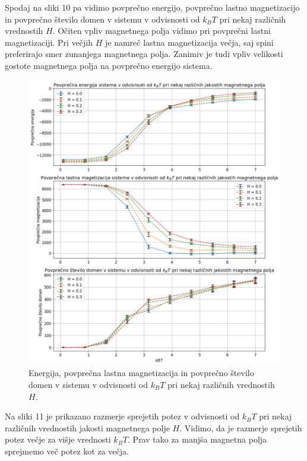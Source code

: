 \documentclass[slovene,11pt,a4paper]{article}
\begin{document}
Spodaj na sliki 10 pa vidimo povprečno energijo, povprečno lastno magnetizacijo in povprečno število domen v sistemu v odvisnosti od $k_BT$ pri nekaj različnih vrednostih $H$. Očiten vpliv magnetnega polja vidimo pri povprečni lastni magnetizaciji. Pri večjih $H$ je namreč lastna magnetizacija večja, saj spini preferirajo smer zunanjega magnetnega polja. Zanimiv je tudi vpliv velikosti gostote magnetnega polja na povprečno energijo sistema.

\begin{figure}[h!]
\centering
\includegraphics[width=\linewidth]{ising6.png}
\caption{Energija, povprečna lastna magnetizacija in povprečno število domen v sistemu v odvisnosti od $k_BT$ pri nekaj različnih vrednostih $H$.}
\end{figure}

Na sliki 11 je prikazano razmerje sprejetih potez v odvisnosti od $k_BT$ pri nekaj različnih vrednostih jakosti magnetnega polje $H$. Vidimo, da je razmerje sprejetih potez večje za višje vrednosti $k_BT$. Prav tako za manjša magnetna polja sprejmemo več potez kot za večja.

\newpage
\end{document}
